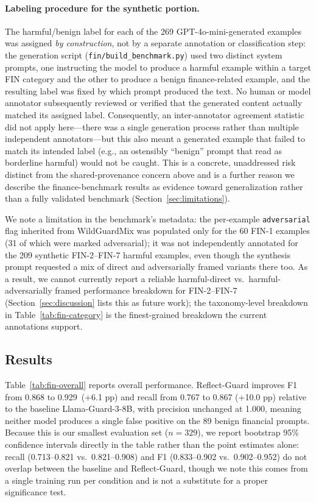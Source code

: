 \documentclass[superintelligence,article,accept,moreauthors]{Definitions/mdpi}
\renewcommand{\hl}[1]{#1}
\begin{document}
\paragraph{\hl{Labeling procedure for the synthetic portion.} %
} The harmful/benign label for each of the 269 GPT-4o-mini-generated examples was assigned \emph{by construction}, not by a separate annotation or classification step: the generation script (\texttt{fin/build\_benchmark.py}) used two distinct system prompts, one instructing the model to produce a harmful example within a target FIN category and the other to produce a benign finance-related example, and the resulting label was fixed by which prompt produced the text. No human or model annotator subsequently reviewed or verified that the generated content actually matched its assigned label. Consequently, an inter-annotator agreement statistic did not apply here---there was a single generation process rather than multiple independent annotators---but this also meant a generated example that failed to match its intended label (e.g., an ostensibly ``benign'' prompt that read as borderline harmful) would not be caught. This is a concrete, unaddressed risk distinct from the shared-provenance concern above and is a further reason we describe the finance-benchmark results as evidence toward generalization rather than a fully validated benchmark (Section~\ref{sec:limitations}).

We note a limitation in the benchmark's metadata: the per-example \texttt{adversarial} flag inherited from WildGuardMix was populated only for the 60 FIN-1 examples (31 of which were marked adversarial); it was not independently annotated for the 209 synthetic FIN-2--FIN-7 harmful examples, even though the synthesis prompt requested a mix of direct and adversarially framed variants there too. As a result, we cannot currently report a reliable harmful-direct vs.\ harmful-adversarially framed performance breakdown for FIN-2--FIN-7 (Section~\ref{sec:discussion} lists this as future work); the taxonomy-level breakdown in Table~\ref{tab:fin-category} is the finest-grained breakdown the current annotations support.

\subsection{Results}

Table~\ref{tab:fin-overall} reports overall performance. Reflect-Guard improves F1 from 0.868 to 0.929~(+6.1 pp) and recall from 0.767 to 0.867 (+10.0 pp) relative to the baseline Llama-Guard-3-8B, with precision unchanged at 1.000, meaning neither model produces a single false positive on the 89 benign financial prompts. Because this is our smallest evaluation set ($n=329$), we report bootstrap 95\% confidence intervals directly in the table rather than the point estimates alone: recall (0.713--0.821 vs.\ 0.821--0.908) and F1 (0.833--0.902 vs.\ 0.902--0.952) do not overlap between the baseline and Reflect-Guard, though we note this comes from a single training run per condition and is not a substitute for a proper significance test.
\end{document}
